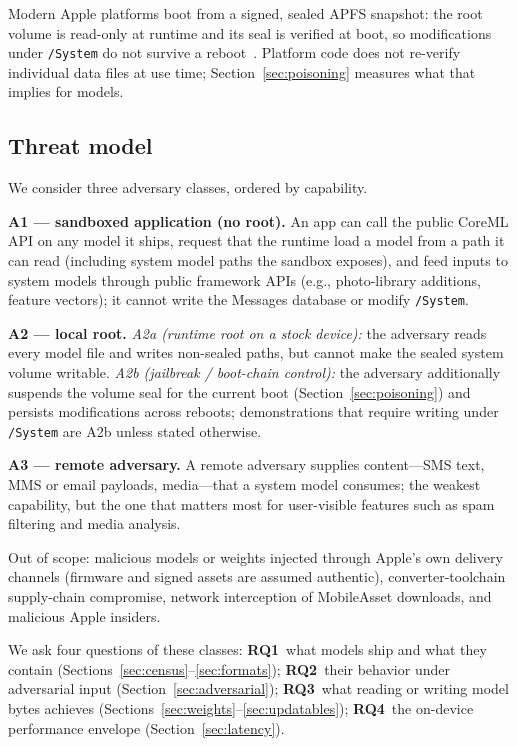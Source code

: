 \documentclass[letterpaper,twocolumn,10pt]{article}
\begin{document}
Modern Apple platforms boot from a signed, sealed APFS snapshot: the root
volume is read-only at runtime and its seal is verified at boot, so
modifications under \texttt{/System} do not survive a
reboot~\cite{apple_platform_security}. Platform code does not re-verify
individual data files at use time; Section~\ref{sec:poisoning} measures
what that implies for models.

\subsection{Threat model}
\label{sec:threat}

We consider three adversary classes, ordered by capability.

\textbf{A1 --- sandboxed application (no root).}
An app can call the public CoreML API on any model it ships, request that
the runtime load a model from a path it can read (including system model
paths the sandbox exposes), and feed inputs to system models through public
framework APIs (e.g., photo-library additions, feature vectors); it cannot
write the Messages database or modify \texttt{/System}.

\textbf{A2 --- local root.}
\emph{A2a (runtime root on a stock device):} the adversary reads every
model file and writes non-sealed paths, but cannot make the sealed system
volume writable.
\emph{A2b (jailbreak / boot-chain control):} the adversary additionally
suspends the volume seal for the current boot
(Section~\ref{sec:poisoning}) and persists modifications across reboots;
demonstrations that require writing under \texttt{/System} are A2b unless
stated otherwise.

\textbf{A3 --- remote adversary.}
A remote adversary supplies content---SMS text, MMS or email payloads,
media---that a system model consumes; the weakest capability, but the one
that matters most for user-visible features such as spam filtering and
media analysis.

Out of scope: malicious models or weights injected through Apple's own
delivery channels (firmware and signed assets are assumed authentic),
converter-toolchain supply-chain compromise, network interception of
MobileAsset downloads, and malicious Apple insiders.

We ask four questions of these classes:
\textbf{RQ1}~what models ship and what they
contain (Sections~\ref{sec:census}--\ref{sec:formats});
\textbf{RQ2}~their behavior under adversarial input
(Section~\ref{sec:adversarial});
\textbf{RQ3}~what reading or writing model bytes achieves
(Sections~\ref{sec:weights}--\ref{sec:updatables});
\textbf{RQ4}~the on-device performance envelope
(Section~\ref{sec:latency}).
\end{document}
